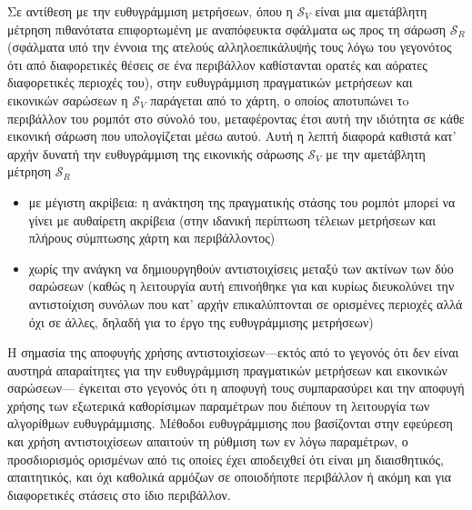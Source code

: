 \begin{gg_box}
\begin{remark}
Σε αντίθεση με την ευθυγράμμιση μετρήσεων, όπου η $\mathcal{S}_V$ είναι μια
αμετάβλητη μέτρηση πιθανότατα επιφορτωμένη με αναπόφευκτα σφάλματα ως προς τη
σάρωση $\mathcal{S}_R$ (σφάλματα υπό την έννοια της ατελούς αλληλοεπικάλυψής
τους λόγω του γεγονότος ότι από διαφορετικές θέσεις σε ένα περιβάλλον
καθίστανται ορατές και αόρατες διαφορετικές περιοχές του), στην ευθυγράμμιση
πραγματικών μετρήσεων και εικονικών σαρώσεων η $\mathcal{S}_V$ παράγεται από
το χάρτη, ο οποίος αποτυπώνει τo περιβάλλον του ρομπότ στο σύνολό του,
μεταφέροντας έτσι αυτή την ιδιότητα σε κάθε εικονική σάρωση που υπολογίζεται
μέσω αυτού. Αυτή η λεπτή διαφορά καθιστά κατ' αρχήν δυνατή την ευθυγράμμιση
της εικονικής σάρωσης $\mathcal{S}_V$ με την αμετάβλητη μέτρηση $\mathcal{S}_R$
\begin{itemize}
  \item με μέγιστη ακρίβεια: η ανάκτηση της πραγματικής στάσης του ρομπότ
        μπορεί να γίνει με αυθαίρετη ακρίβεια (στην ιδανική περίπτωση τέλειων
        μετρήσεων και πλήρους σύμπτωσης χάρτη και περιβάλλοντος)
  \item χωρίς την ανάγκη να δημιουργηθούν αντιστοιχίσεις μεταξύ των ακτίνων των
        δύο σαρώσεων (καθώς η λειτουργία αυτή επινοήθηκε για και κυρίως
        διευκολύνει την αντιστοίχιση συνόλων που κατ' αρχήν επικαλύπτονται σε
        ορισμένες περιοχές αλλά όχι σε άλλες, δηλαδή για το έργο της
        ευθυγράμμισης μετρήσεων)
\end{itemize}
\end{remark}
\end{gg_box}

\begin{gg_box}
\begin{remark}
Η σημασία της αποφυγής χρήσης αντιστοιχίσεων---εκτός από το γεγονός ότι δεν είναι
αυστηρά απαραίτητες για την ευθυγράμμιση πραγματικών μετρήσεων και εικονικών
σαρώσεων--- έγκειται στο γεγονός ότι η αποφυγή τους συμπαρασύρει και την
αποφυγή χρήσης των εξωτερικά καθορίσιμων παραμέτρων που διέπουν τη λειτουργία των
αλγορίθμων ευθυγράμμισης. Μέθοδοι ευθυγράμμισης που βασίζονται στην εφεύρεση
και χρήση αντιστοιχίσεων απαιτούν τη ρύθμιση των εν λόγω παραμέτρων, ο
προσδιορισμός ορισμένων από τις οποίες έχει αποδειχθεί ότι είναι μη
διαισθητικός, απαιτητικός, και όχι καθολικά αρμόζων σε οποιοδήποτε
περιβάλλον ή ακόμη και για διαφορετικές στάσεις στο ίδιο περιβάλλον.
\end{remark}
\end{gg_box}


